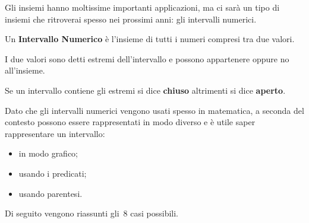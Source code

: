 {Gli insiemi hanno moltissime importanti applicazioni, ma ci sarà un tipo di 
insiemi che ritroverai spesso nei prossimi anni: gli intervalli numerici.

\begin{definizione}
Un \textbf{Intervallo Numerico} è l'insieme di tutti i numeri compresi tra 
due valori.

I due valori sono detti estremi dell'intervallo e possono appartenere 
oppure no all'insieme.
\end{definizione}

Se un intervallo contiene gli estremi si dice \textbf{chiuso} altrimenti si 
dice \textbf{aperto}.

Dato che gli intervalli numerici vengono usati spesso in matematica, a 
seconda del contesto possono essere rappresentati in modo diverso e è utile 
saper rappresentare un intervallo:
\begin{itemize} [nosep]
 \item in modo grafico;
 \item usando i predicati;
 \item usando parentesi.
\end{itemize}

Di seguito vengono riassunti gli~8 casi possibili.

}

